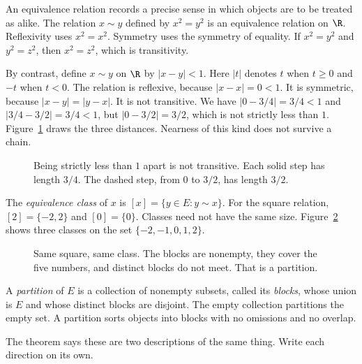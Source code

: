 An equivalence relation records a precise sense in which objects are to be treated as alike. The relation $x\sim y$ defined by $x^2=y^2$ is an equivalence relation on $\R$. Reflexivity uses $x^2=x^2$. Symmetry uses the symmetry of equality. If $x^2=y^2$ and $y^2=z^2$, then $x^2=z^2$, which is transitivity.

By contrast, define $x\sim y$ on $\R$ by $|x-y|<1$. Here $|t|$ denotes $t$ when $t\ge 0$ and $-t$ when $t<0$. The relation is reflexive, because $|x-x|=0<1$. It is symmetric, because $|x-y|=|y-x|$. It is not transitive. We have $|0-3/4|=3/4<1$ and $|3/4-3/2|=3/4<1$, but $|0-3/2|=3/2$, which is not strictly less than $1$. Figure~\ref{fig:lang-transitive} draws the three distances. Nearness of this kind does not survive a chain.

\begin{figure}[ht]
\centering
{}
\caption{Being strictly less than $1$ apart is not transitive. Each solid step has length $3/4$. The dashed step, from $0$ to $3/2$, has length $3/2$.}
\label{fig:lang-transitive}
\end{figure}

The \emph{equivalence class} of $x$ is $[x]=\{y\in E:y\sim x\}$. For the square relation, $[2]=\{-2,2\}$ and $[0]=\{0\}$. Classes need not have the same size. Figure~\ref{fig:lang-classes} shows three classes on the set $\{-2,-1,0,1,2\}$.

\begin{figure}[ht]
\centering
{}
\caption{Same square, same class. The blocks are nonempty, they cover the five numbers, and distinct blocks do not meet. That is a partition.}
\label{fig:lang-classes}
\end{figure}

A \emph{partition} of $E$ is a collection of nonempty subsets, called its \emph{blocks}, whose union is $E$ and whose distinct blocks are disjoint. The empty collection partitions the empty set. A partition sorts objects into blocks with no omissions and no overlap.

The theorem says these are two descriptions of the same thing. Write each direction on its own.

